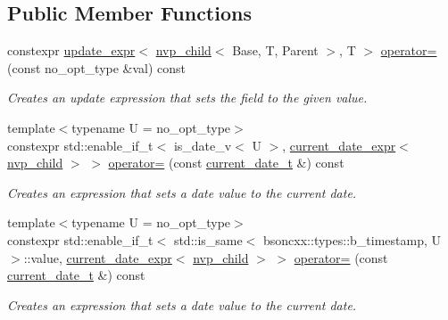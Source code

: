 \subsection*{Public Member Functions}
\begin{DoxyCompactItemize}
\item 
constexpr \hyperlink{classmangrove_1_1update__expr}{update\+\_\+expr}$<$ \hyperlink{classmangrove_1_1nvp__child}{nvp\+\_\+child}$<$ Base, T, Parent $>$, T $>$ \hyperlink{classmangrove_1_1nvp__child_aa62578360129ffc100467825e0a34cf2}{operator=} (const no\+\_\+opt\+\_\+type \&val) const \hypertarget{classmangrove_1_1nvp__child_aa62578360129ffc100467825e0a34cf2}{}\label{classmangrove_1_1nvp__child_aa62578360129ffc100467825e0a34cf2}

\begin{DoxyCompactList}\small\item\em Creates an update expression that sets the field to the given value. \end{DoxyCompactList}\item 
{\footnotesize template$<$typename U  = no\+\_\+opt\+\_\+type$>$ }\\constexpr std\+::enable\+\_\+if\+\_\+t$<$ is\+\_\+date\+\_\+v$<$ U $>$, \hyperlink{classmangrove_1_1current__date__expr}{current\+\_\+date\+\_\+expr}$<$ \hyperlink{classmangrove_1_1nvp__child}{nvp\+\_\+child} $>$ $>$ \hyperlink{classmangrove_1_1nvp__child_a220d36aa2c0c436e1fd14b8ead8e2725}{operator=} (const \hyperlink{structmangrove_1_1current__date__t}{current\+\_\+date\+\_\+t} \&) const 
\begin{DoxyCompactList}\small\item\em Creates an expression that sets a date value to the current date. \end{DoxyCompactList}\item 
{\footnotesize template$<$typename U  = no\+\_\+opt\+\_\+type$>$ }\\constexpr std\+::enable\+\_\+if\+\_\+t$<$ std\+::is\+\_\+same$<$ bsoncxx\+::types\+::b\+\_\+timestamp, U $>$\+::value, \hyperlink{classmangrove_1_1current__date__expr}{current\+\_\+date\+\_\+expr}$<$ \hyperlink{classmangrove_1_1nvp__child}{nvp\+\_\+child} $>$ $>$ \hyperlink{classmangrove_1_1nvp__child_ae6fccc6df51e55ae066aa2e14492c256}{operator=} (const \hyperlink{structmangrove_1_1current__date__t}{current\+\_\+date\+\_\+t} \&) const 
\begin{DoxyCompactList}\small\item\em Creates an expression that sets a date value to the current date. \end{DoxyCompactList}\item 

\end{DoxyCompactItemize}
